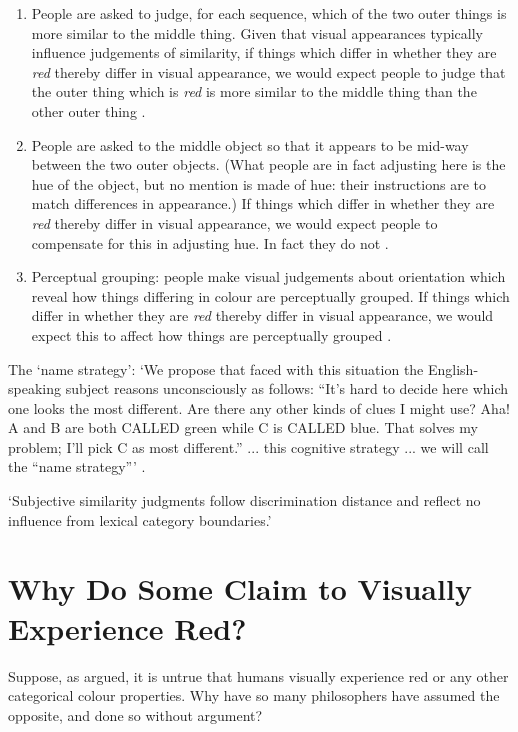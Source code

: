 \documentclass[12pt]{extarticle}
\begin{document}
\begin{multicols*}{3}
\begin{enumerate}
\item People are asked to judge, for each sequence, which of the two outer
things is more similar to the middle thing. Given that visual appearances typically influence
judgements of similarity, if things which differ in whether they are
\emph{red} thereby differ in visual appearance, we would expect people to
judge that the outer thing which is \emph{red} is more similar to the
middle thing than the other outer thing
\citep{kay_what_1984,witzel2014category}.

\item People are asked to the middle object so that it appears to be mid-way
between the two outer objects. (What people are in fact adjusting here is
the hue of the object, but no mention is made of hue: their instructions
are to match differences in appearance.) If things which differ in whether
they are \emph{red} thereby differ in visual appearance, we would expect
people to compensate for this in adjusting hue. In fact they do not
\citep{witzel2014category}.

\item Perceptual grouping: people make visual judgements about orientation which
reveal how things differing in colour are perceptually grouped.  If things which differ in whether
they are \emph{red} thereby differ in visual appearance, we would expect
this to affect how things are perceptually grouped \citet{webster:2012_color}.

\end{enumerate}

The ‘name strategy’: ‘We propose that faced with this situation the
English-speaking subject reasons
unconsciously as follows: “It's hard to decide here which one looks the most
different. Are there any other kinds of clues I might use? Aha! A and B are
both CALLED green while C is CALLED blue. That solves my problem; I'll pick C
as most different.” ... this cognitive strategy ... we will call the
“name strategy”’ \citep[p.~72]{kay_what_1984}.

‘Subjective similarity judgments follow
discrimination distance and reflect no influence from lexical category
boundaries.’ \citep[p.~73]{kay_what_1984}



\section{Why Do Some Claim to Visually Experience Red?}

Suppose, as argued, it is untrue that humans visually experience red or any
other categorical colour properties.
Why have so many philosophers have assumed the opposite, and done so without argument?


\end{multicols*}
\end{document}
